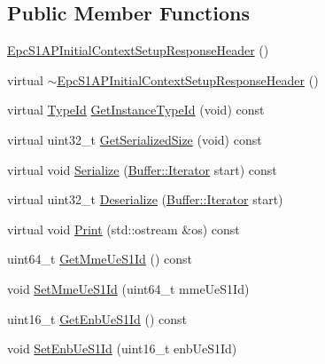 \subsection*{Public Member Functions}
\begin{DoxyCompactItemize}
\item 
\hyperlink{classns3_1_1EpcS1APInitialContextSetupResponseHeader_aaed15dc5e1a9fe2df50f414601f69f80}{Epc\+S1\+A\+P\+Initial\+Context\+Setup\+Response\+Header} ()
\item 
virtual \hyperlink{classns3_1_1EpcS1APInitialContextSetupResponseHeader_af9f373072052afd2aa7033becbf088f1}{$\sim$\+Epc\+S1\+A\+P\+Initial\+Context\+Setup\+Response\+Header} ()
\item 
virtual \hyperlink{classns3_1_1TypeId}{Type\+Id} \hyperlink{classns3_1_1EpcS1APInitialContextSetupResponseHeader_a9ca4a216ad174e49814eb3a1a475731a}{Get\+Instance\+Type\+Id} (void) const 
\item 
virtual uint32\+\_\+t \hyperlink{classns3_1_1EpcS1APInitialContextSetupResponseHeader_a0a60b0abcedd285fd9e6592f8e6aa1f0}{Get\+Serialized\+Size} (void) const 
\item 
virtual void \hyperlink{classns3_1_1EpcS1APInitialContextSetupResponseHeader_a678e89292162d6988328f1a91f021c0e}{Serialize} (\hyperlink{classns3_1_1Buffer_1_1Iterator}{Buffer\+::\+Iterator} start) const 
\item 
virtual uint32\+\_\+t \hyperlink{classns3_1_1EpcS1APInitialContextSetupResponseHeader_a75dba269a5c42762f530a7d731a77a15}{Deserialize} (\hyperlink{classns3_1_1Buffer_1_1Iterator}{Buffer\+::\+Iterator} start)
\item 
virtual void \hyperlink{classns3_1_1EpcS1APInitialContextSetupResponseHeader_a1fb625aa7f9ff2b372155c99b09eed51}{Print} (std\+::ostream \&os) const 
\item 
uint64\+\_\+t \hyperlink{classns3_1_1EpcS1APInitialContextSetupResponseHeader_ae8785ca4fa4ee51cb584af22e585557f}{Get\+Mme\+Ue\+S1\+Id} () const 
\item 
void \hyperlink{classns3_1_1EpcS1APInitialContextSetupResponseHeader_a3911b197128eec19d34228d88b453785}{Set\+Mme\+Ue\+S1\+Id} (uint64\+\_\+t mme\+Ue\+S1\+Id)
\item 
uint16\+\_\+t \hyperlink{classns3_1_1EpcS1APInitialContextSetupResponseHeader_a8cac17731646f46ebaad70df0eb0715a}{Get\+Enb\+Ue\+S1\+Id} () const 
\item 
void \hyperlink{classns3_1_1EpcS1APInitialContextSetupResponseHeader_a4659727f42c4999b6122b9e02fac9bc0}{Set\+Enb\+Ue\+S1\+Id} (uint16\+\_\+t enb\+Ue\+S1\+Id)

\end{DoxyCompactItemize}

